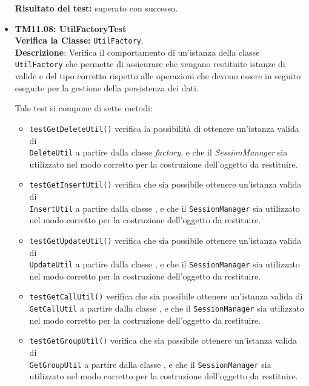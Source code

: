 \begin{itemize}
\begin{itemize}
\end{itemize}
\textbf{Risultato del test:} superato con successo.

\item[\passed] \textbf{TM11.08: UtilFactoryTest}\\
\textbf{Verifica la Classe:} \texttt{UtilFactory}.\\
\textbf{Descrizione}: Verifica il comportamento di un'istanza della classe \texttt{UtilFactory} che permette di assicurare che vengano restituite istanze di  valide e del tipo corretto rispetto alle operazioni che devono essere in seguito eseguite per la gestione della persistenza dei dati.

Tale test si compone di sette metodi:
\begin{itemize}
\item \texttt{testGetDeleteUtil()} verifica la possibilità di ottenere un'istanza valida di \\ \texttt{DeleteUtil} a partire dalla classe \textit{factory}, e che il \textit{SessionManager} sia utilizzato nel modo corretto per la costruzione dell'oggetto da restituire.

\item \texttt{testGetInsertUtil()} verifica che sia possibile ottenere un'istanza valida di \\ \texttt{InsertUtil} a partire dalla classe , e che il \texttt{SessionManager} sia utilizzato nel modo corretto per la costruzione dell'oggetto da restituire.

\item \texttt{testGetUpdateUtil()} verifica che sia possibile ottenere un'istanza valida di \\ \texttt{UpdateUtil} a partire dalla classe , e che il \texttt{SessionManager} sia utilizzato nel modo corretto per la costruzione dell'oggetto da restituire.

\item \texttt{testGetCallUtil()} verifica che sia possibile ottenere un'istanza valida di \\ \texttt{GetCallUtil} a partire dalla classe , e che il \texttt{SessionManager} sia utilizzato nel modo corretto per la costruzione dell'oggetto da restituire.

\item \texttt{testGetGroupUtil()} verifica che sia possibile ottenere un'istanza valida di \\ \texttt{GetGroupUtil} a partire dalla classe , e che il \texttt{SessionManager} sia utilizzato nel modo corretto per la costruzione dell'oggetto da restituire.


\end{itemize}
\end{itemize}

